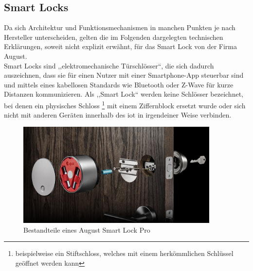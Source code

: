 \subsection{Smart Locks}
\label{sec:sota_smart_locks}
	Da sich Architektur und Funktionsmechanismen in manchen Punkten je nach Hersteller unterscheiden, gelten die im Folgenden dargelegten technischen Erklärungen, soweit nicht explizit erwähnt, für das Smart Lock von der Firma August. 
    \medskip\\
    \noindent Smart Locks sind ,,elektromechanische Türschlösser``, die sich dadurch auszeichnen, dass sie für einen Nutzer mit einer Smartphone-App steuerbar sind und mittels eines kabellosen Standards wie Bluetooth oder Z-Wave  für kurze Distanzen kommunizieren.
	Als ,,Smart Lock`` werden keine Schlösser bezeichnet, bei denen ein physisches Schloss
	\footnote{beispielweise ein Stiftschloss, welches mit einem herkömmlichen Schlüssel geöffnet werden kann} 
	mit einem Ziffernblock ersetzt wurde oder sich nicht mit anderen Geräten innerhalb des \gls{iot} in irgendeiner Weise verbinden.\cite{Ho2016}
	
	\begin{figure}[H]
		\centering
		\includegraphics[width=0.9\textwidth]{graphics/august_2.jpg}
		\caption[Bestandteile eines August Smart Lock Pro]{Bestandteile eines August Smart Lock Pro\cite{August}}
		\label{fig:august1}
	\end{figure}
	

